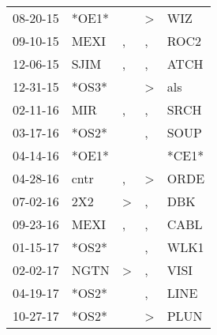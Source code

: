 \begin{supertabular}{p{0.07\textwidth}p{0.06\textwidth}p{0.02\textwidth}p{0.02\textwidth}p{0.06\textwidth}}
          08-20-15\textsuperscript{} &                            *OE1* &                  &     \textgreater &            WIZ\textsuperscript{} \\
          09-10-15\textsuperscript{} &           MEXI\textsuperscript{} &                , &                , &           ROC2\textsuperscript{} \\
          12-06-15\textsuperscript{} &           SJIM\textsuperscript{} &                , &                , &           ATCH\textsuperscript{} \\
          12-31-15\textsuperscript{} &                            *OS3* &                  &     \textgreater &            als\textsuperscript{} \\
          02-11-16\textsuperscript{} &            MIR\textsuperscript{} &                , &                , &           SRCH\textsuperscript{} \\
          03-17-16\textsuperscript{} &                            *OS2* &                  &                , &           SOUP\textsuperscript{} \\
          04-14-16\textsuperscript{} &                            *OE1* &                  &                  &                            *CE1* \\
          04-28-16\textsuperscript{} &           cntr\textsuperscript{} &                , &     \textgreater &           ORDE\textsuperscript{} \\
          07-02-16\textsuperscript{} &            2X2\textsuperscript{} &     \textgreater &                , &            DBK\textsuperscript{} \\
          09-23-16\textsuperscript{} &           MEXI\textsuperscript{} &                , &                , &           CABL\textsuperscript{} \\
          01-15-17\textsuperscript{} &                            *OS2* &                  &                , &           WLK1\textsuperscript{} \\
          02-02-17\textsuperscript{} &           NGTN\textsuperscript{} &     \textgreater &                , &           VISI\textsuperscript{} \\
          04-19-17\textsuperscript{} &                            *OS2* &                  &                , &           LINE\textsuperscript{} \\
          10-27-17\textsuperscript{} &                            *OS2* &                  &     \textgreater &           PLUN\textsuperscript{} \\

\end{supertabular}
